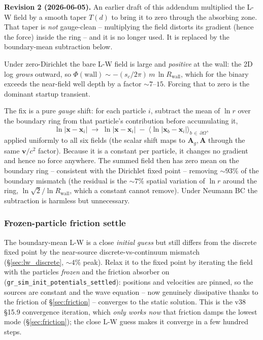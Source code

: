 \documentclass[11pt,a4paper]{article}
\newcommand{\vv}[1]{\mathbf{#1}}
\newcommand{\Ag}{\vv{A}_g}
\begin{document}
\begin{shaded}
\textbf{Revision 2 (2026-06-05).}  An earlier draft of this addendum
multiplied the L-W field by a smooth taper $T(d)$ to bring it to zero
through the absorbing zone.  That taper is \emph{not} gauge-clean --
multiplying the field distorts its gradient (hence the force) inside
the ring -- and it is no longer used.  It is replaced by the
boundary-mean subtraction below.
\end{shaded}

Under zero-Dirichlet the bare L-W field is large and \emph{positive} at
the wall: the 2D log \emph{grows} outward, so $\Phi(\text{wall}) \sim
-(s_c/2\pi)\,m\,\ln R_\text{wall}$, which for the binary exceeds the
near-field well depth by a factor $\sim 7$--$15$.  Forcing that to zero
is the dominant startup transient.

The fix is a pure \emph{gauge} shift: for each particle $i$, subtract
the mean of $\ln r$ over the boundary ring from that particle's
contribution before accumulating it,
\begin{equation}
  \ln|\vv{x}-\vv{x}_i| \;\longrightarrow\;
  \ln|\vv{x}-\vv{x}_i| \;-\; \big\langle \ln|\vv{x}_b - \vv{x}_i|\big\rangle_{b\,\in\,\partial\Omega},
\end{equation}
applied uniformly to all six fields (the scalar shift maps to $\Ag,
\vv{A}$ through the same $\vv{v}/c^2$ factor).  Because it is a constant
per particle, it changes no gradient and hence no force anywhere.  The
summed field then has zero mean on the boundary ring -- consistent with
the Dirichlet fixed point -- removing $\sim 93\%$ of the boundary
mismatch (the residual is the $\sim 7\%$ spatial variation of $\ln r$
around the ring, $\ln\sqrt2 / \ln R_\text{wall}$, which a constant
cannot remove).  Under Neumann BC the subtraction is harmless but
unnecessary.

\subsubsection*{Frozen-particle friction settle}

The boundary-mean L-W is a close \emph{initial guess} but still differs
from the discrete fixed point by the near-source discrete-vs-continuum
mismatch (\S\ref{sec:lw_discrete}, $\sim 4\%$ peak).  Relax it to the
fixed point by iterating the field with the particles \emph{frozen} and
the friction absorber on (\texttt{gr\_sim\_init\_potentials\_settled}):
positions and velocities are pinned, so the sources are constant and
the wave equation -- now genuinely dissipative thanks to the friction
of \S\ref{sec:friction} -- converges to the static solution.  This is
the v38 \S 15.9 convergence iteration, which \emph{only works now} that
friction damps the lowest mode (\S\ref{sec:friction}); the close L-W
guess makes it converge in a few hundred steps.
\end{document}
